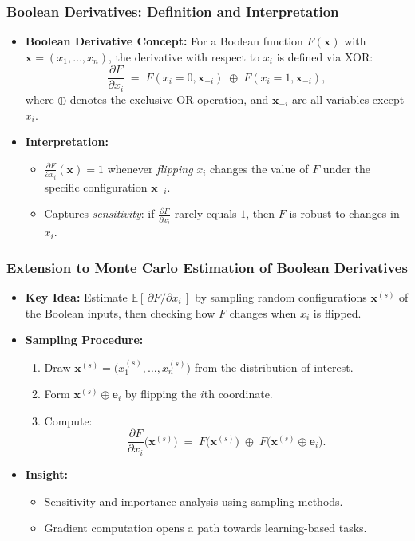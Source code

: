 \begin{frame}[t]
\frametitle{Boolean Derivatives: Definition and Interpretation}
\begin{itemize}
\item \textbf{Boolean Derivative Concept:}  
  For a Boolean function \(F(\mathbf{x})\) with \(\mathbf{x}=(x_1,\ldots,x_n)\), the derivative with respect to \(x_i\) is defined via XOR:
  \[
    \frac{\partial F}{\partial x_i}
    \;=\;
    F(x_i=0,\mathbf{x}_{-i})
    \;\oplus\;
    F(x_i=1,\mathbf{x}_{-i}),
  \]
  where \(\oplus\) denotes the exclusive-OR operation, and \(\mathbf{x}_{-i}\) are all variables except \(x_i\).
\item \textbf{Interpretation:}  
  \begin{itemize}
    \item \(\frac{\partial F}{\partial x_i}(\mathbf{x})=1\) whenever \emph{flipping} \(x_i\) changes the value of \(F\) under the specific configuration \(\mathbf{x}_{-i}\).  
    \item Captures \emph{sensitivity}: if \(\frac{\partial F}{\partial x_i}\) rarely equals \(1\), then \(F\) is robust to changes in \(x_i\).  
  \end{itemize}
\end{itemize}
\end{frame}

\begin{frame}[allowframebreaks]
\frametitle{Extension to Monte Carlo Estimation of Boolean Derivatives}
\begin{itemize}
  \item \textbf{Key Idea:} Estimate \(\mathbb{E}[\,\partial F / \partial x_i\,]\) by sampling random configurations \(\mathbf{x}^{(s)}\) of the Boolean inputs, then checking how \(F\) changes when \(x_i\) is flipped.
  \vspace{8pt}
  \item \textbf{Sampling Procedure:}
    \begin{enumerate}
      \item Draw \(\mathbf{x}^{(s)} = \bigl(x_1^{(s)},\dots,x_n^{(s)}\bigr)\) from the distribution of interest.  
      \item Form \(\mathbf{x}^{(s)} \oplus \mathbf{e}_i\) by flipping the \(i\)th coordinate.
      \item Compute:
        \[
          \frac{\partial F}{\partial x_i}\bigl(\mathbf{x}^{(s)}\bigr)
          \;=\;
          F\!\bigl(\mathbf{x}^{(s)}\bigr)
          \;\oplus\;
          F\!\bigl(\mathbf{x}^{(s)} \oplus \mathbf{e}_i\bigr).
        \]
    \end{enumerate}
  \item \textbf{Insight:}  
    \begin{itemize}
    \item{Sensitivity and importance analysis using sampling methods.}
    \item{Gradient computation opens a path towards learning-based tasks.}
    \end{itemize}
\end{itemize}
\end{frame}

